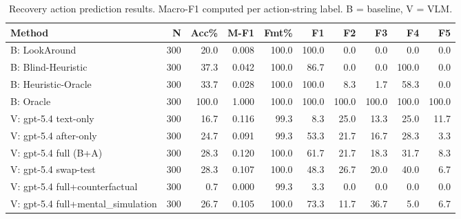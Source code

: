 \begin{table}[t]
\centering
\caption{Recovery action prediction results. Macro-F1 computed per action-string label. B = baseline, V = VLM.}
\label{tab:main}
\small
\begin{tabular}{l r r r r r r r r r }
\toprule
Method & N & Acc\% & M-F1 & Fmt\% & F1 & F2 & F3 & F4 & F5 \\
\midrule
B: LookAround & 300 & 20.0 & 0.008 & 100.0 & 100.0 & 0.0 & 0.0 & 0.0 & 0.0 \\
B: Blind-Heuristic & 300 & 37.3 & 0.042 & 100.0 & 86.7 & 0.0 & 0.0 & 100.0 & 0.0 \\
B: Heuristic-Oracle & 300 & 33.7 & 0.028 & 100.0 & 100.0 & 8.3 & 1.7 & 58.3 & 0.0 \\
B: Oracle & 300 & 100.0 & 1.000 & 100.0 & 100.0 & 100.0 & 100.0 & 100.0 & 100.0 \\
\midrule
V: gpt-5.4 text-only & 300 & 16.7 & 0.116 & 99.3 & 8.3 & 25.0 & 13.3 & 25.0 & 11.7 \\
V: gpt-5.4 after-only & 300 & 24.7 & 0.091 & 99.3 & 53.3 & 21.7 & 16.7 & 28.3 & 3.3 \\
V: gpt-5.4 full (B+A) & 300 & 28.3 & 0.120 & 100.0 & 61.7 & 21.7 & 18.3 & 31.7 & 8.3 \\
V: gpt-5.4 swap-test & 300 & 28.3 & 0.107 & 100.0 & 48.3 & 26.7 & 20.0 & 40.0 & 6.7 \\
V: gpt-5.4 full+counterfactual & 300 & 0.7 & 0.000 & 99.3 & 3.3 & 0.0 & 0.0 & 0.0 & 0.0 \\
V: gpt-5.4 full+mental_simulation & 300 & 26.7 & 0.105 & 100.0 & 73.3 & 11.7 & 36.7 & 5.0 & 6.7 \\
\bottomrule
\end{tabular}
\end{table}
